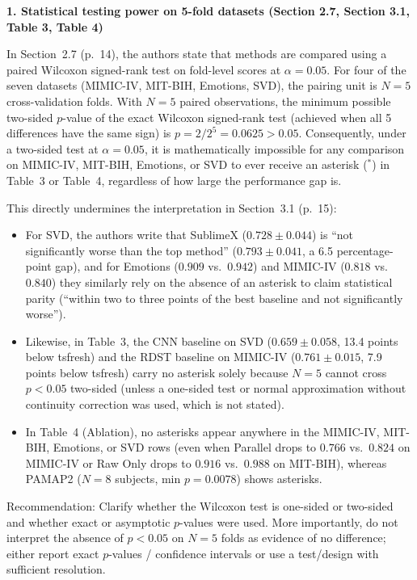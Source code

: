\documentclass[11pt]{article}
\newcommand{\rcitem}[2]{\begin{reviewerbox}\textbf{#1}\par\smallskip#2\end{reviewerbox}}
\begin{document}
\rcitem{1. Statistical testing power on 5-fold datasets (Section 2.7, Section 3.1, Table 3, Table 4)}{In Section~2.7 (p.~14), the authors state that methods are compared using a paired Wilcoxon signed-rank test on fold-level scores at $\alpha=0.05$. For four of the seven datasets (MIMIC-IV, MIT-BIH, Emotions, SVD), the pairing unit is $N=5$ cross-validation folds. With $N=5$ paired observations, the minimum possible two-sided $p$-value of the exact Wilcoxon signed-rank test (achieved when all 5 differences have the same sign) is $p = 2/2^5 = 0.0625 > 0.05$. Consequently, under a two-sided test at $\alpha=0.05$, it is mathematically impossible for any comparison on MIMIC-IV, MIT-BIH, Emotions, or SVD to ever receive an asterisk ($^*$) in Table~3 or Table~4, regardless of how large the performance gap is.\par\smallskip
This directly undermines the interpretation in Section~3.1 (p.~15):
\begin{itemize}[nosep,leftmargin=1.4em]
  \item For SVD, the authors write that SublimeX ($0.728 \pm 0.044$) is ``not significantly worse than the top method'' ($0.793 \pm 0.041$, a 6.5 percentage-point gap), and for Emotions ($0.909$ vs.\ $0.942$) and MIMIC-IV ($0.818$ vs.\ $0.840$) they similarly rely on the absence of an asterisk to claim statistical parity (``within two to three points of the best baseline and not significantly worse'').
  \item Likewise, in Table~3, the CNN baseline on SVD ($0.659 \pm 0.058$, 13.4 points below tsfresh) and the RDST baseline on MIMIC-IV ($0.761 \pm 0.015$, 7.9 points below tsfresh) carry no asterisk solely because $N=5$ cannot cross $p < 0.05$ two-sided (unless a one-sided test or normal approximation without continuity correction was used, which is not stated).
  \item In Table~4 (Ablation), no asterisks appear anywhere in the MIMIC-IV, MIT-BIH, Emotions, or SVD rows (even when Parallel drops to $0.766$ vs.\ $0.824$ on MIMIC-IV or Raw Only drops to $0.916$ vs.\ $0.988$ on MIT-BIH), whereas PAMAP2 ($N=8$ subjects, min $p = 0.0078$) shows asterisks.
\end{itemize}
Recommendation: Clarify whether the Wilcoxon test is one-sided or two-sided and whether exact or asymptotic $p$-values were used. More importantly, do not interpret the absence of $p < 0.05$ on $N=5$ folds as evidence of no difference; either report exact $p$-values / confidence intervals or use a test/design with sufficient resolution.}
\end{document}
